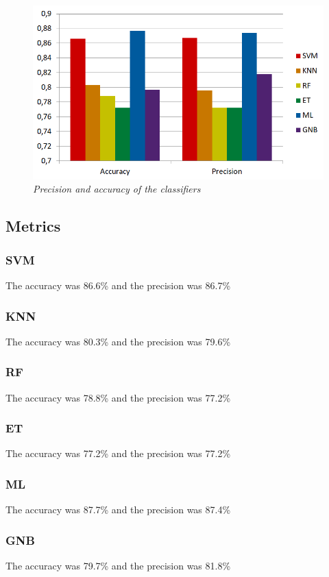 \documentclass[12pt]{article}
\begin{document}
\begin{figure}[!htb]
	\centering 
	\includegraphics[width=1\textwidth]{metrics.png} 
	\caption{\textit{Precision and accuracy of the classifiers}} 
	\label{fig:metrics}
\end{figure}

\subsection{Metrics}
\subsubsection{SVM}
The accuracy was 86.6\% and the precision was 86.7\%
\subsubsection{KNN}
The accuracy was 80.3\% and the precision was 79.6\%
\subsubsection{RF}
The accuracy was 78.8\% and the precision was 77.2\%
\subsubsection{ET}
The accuracy was 77.2\% and the precision was 77.2\%
\subsubsection{ML}
The accuracy was 87.7\% and the precision was 87.4\%
\subsubsection{GNB}
The accuracy was 79.7\% and the precision was 81.8\%
\end{document}
